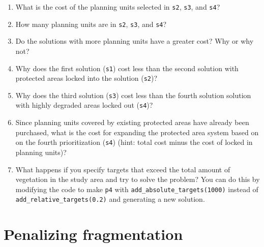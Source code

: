 \documentclass[12pt,]{book}
\makeatletter
\providecommand{\tightlist}{%
  \setlength{\itemsep}{0pt}\setlength{\parskip}{0pt}}
\newenvironment{kframe}{%
\medskip{}
\setlength{\fboxsep}{.8em}
 \def\at@end@of@kframe{}%
 \ifinner\ifhmode%
  \def\at@end@of@kframe{\end{minipage}}%
  \begin{minipage}{\columnwidth}%
 \fi\fi%
 \def\FrameCommand##1{\hskip\@totalleftmargin \hskip-\fboxsep
 \colorbox{shadecolor}{##1}\hskip-\fboxsep
     \hskip-\linewidth \hskip-\@totalleftmargin \hskip\columnwidth}%
 \MakeFramed {\advance\hsize-\width
   \@totalleftmargin\z@ \linewidth\hsize
   \@setminipage}}%
 {\par\unskip\endMakeFramed%
 \at@end@of@kframe}
\newenvironment{rmdblock}[1]
  {
  \begin{itemize}
  \renewcommand{\labelitemi}{
    \raisebox{-.7\height}[0pt][0pt]{
      {\setkeys{Gin}{width=3em,keepaspectratio}\texttt{[image: images/\#1]}}
    }
  }
  \setlength{\fboxsep}{1em}
  \begin{kframe}
  \item
  }
  {
  \end{kframe}
  \end{itemize}
  }
\newenvironment{rmdquestion}
  {\begin{rmdblock}{question}}
  {\end{rmdblock}}
\makeatother
\begin{document}
\begin{rmdquestion}
\begin{enumerate}
\def\labelenumi{\arabic{enumi}.}
\tightlist
\item
  What is the cost of the planning units selected in \texttt{s2}, \texttt{s3}, and \texttt{s4}?
\item
  How many planning units are in \texttt{s2}, \texttt{s3}, and \texttt{s4}?
\item
  Do the solutions with more planning units have a greater cost? Why or why not?
\item
  Why does the first solution (\texttt{s1}) cost less than the second solution with protected areas locked into the solution (\texttt{s2})?
\item
  Why does the third solution (\texttt{s3}) cost less than the fourth solution solution with highly degraded areas locked out (\texttt{s4})?
\item
  Since planning units covered by existing protected areas have already been purchased, what is the cost for expanding the protected area system based on on the fourth prioritization (\texttt{s4}) (hint: total cost minus the cost of locked in planning units)?
\item
  What happens if you specify targets that exceed the total amount of vegetation in the study area and try to solve the problem? You can do this by modifying the code to make \texttt{p4} with \texttt{add\_absolute\_targets(1000)} instead of \texttt{add\_relative\_targets(0.2)} and generating a new solution.
\end{enumerate}
\end{rmdquestion}

\hypertarget{penalizing-fragmentation}{%
\section{Penalizing fragmentation}\label{penalizing-fragmentation}}
\end{document}
